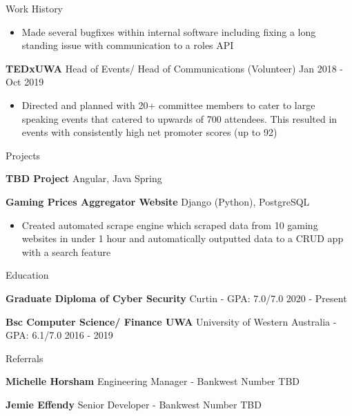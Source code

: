 \documentclass{resume} %
\begin{document}
\begin{rSection}{Work History}
\begin{itemize}
			\item Made several bugfixes within internal software including fixing a long standing issue with communication to a roles API
		\end{itemize}
		\item \textbf{TEDxUWA} {Head of Events/ Head of Communications} (Volunteer) \hfill Jan 2018 - Oct 2019
		\begin{itemize} 
			\item Directed and planned with 20+ committee members to cater to large speaking events that catered to upwards of 700 attendees. This resulted in events with consistently high net promoter scores (up to 92)  
		\end{itemize}
	\end{rSection} 
	
	\begin{rSection}{Projects}
		\vspace{-1.25em}
		\item \textbf{TBD Project} {Angular, Java Spring}
		\item \textbf{Gaming Prices Aggregator Website} {Django (Python), PostgreSQL} 
		\begin{itemize} 
			\item Created automated scrape engine which scraped data from 10 gaming websites in under 1 hour and automatically outputted data to a CRUD app with a search feature
		\end{itemize}
	\end{rSection} 
	
	\begin{rSection}{Education}
		\vspace{-1.25em}
		\item \textbf{Graduate Diploma of Cyber Security} {Curtin} - GPA: 7.0/7.0 \hfill 2020 - Present
		\item \textbf{Bsc Computer Science/ Finance UWA} {University of Western Australia} - GPA: 6.1/7.0 \hfill 2016 - 2019
	\end{rSection} 
	
	\begin{rSection}{Referrals} 
		\vspace{-1.25em}
		\item \textbf{Michelle Horsham} {Engineering Manager - Bankwest} \hfill Number TBD
		
		\item \textbf{Jemie Effendy} {Senior Developer - Bankwest} \hfill Number TBD
	\end{rSection}
\end{document}

